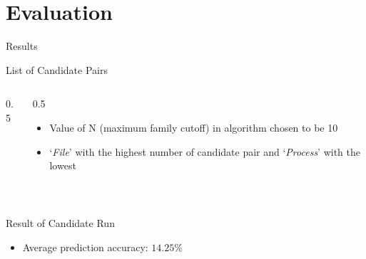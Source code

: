 \documentclass{beamer}
\begin{document}
\section{Evaluation}
\label{sec:Evaluation}
\begin{frame}[h]{Results}
  \begin{block}{List of Candidate Pairs}
\begin{columns}
  \begin{column}{{0.5\textwidth}}
\end{column}
\begin{column}{{0.5\textwidth}}
\begin{itemize}
  \item Value of N (maximum family cutoff) in algorithm chosen to be 10
  \item `\emph{File}' with the highest number of candidate pair and `\emph{Process}' with the lowest
\end{itemize}
\end{column}
\end{columns}
\end{block}
\pause\
\begin{block}{Result of Candidate Run}
\begin{itemize}
  \item Average prediction accuracy: {$14.25\%$}
\end{itemize}
\end{block}
\end{frame}
\end{document}
